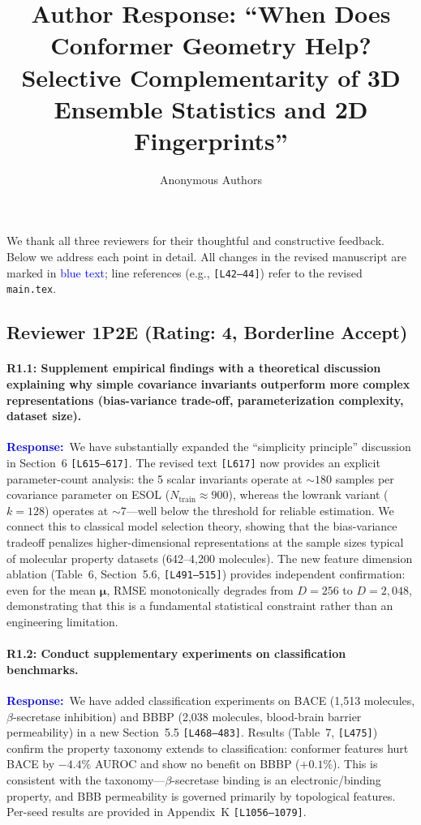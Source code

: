 \documentclass[11pt]{article}
\title{Author Response: ``When Does Conformer Geometry Help? Selective Complementarity of 3D Ensemble Statistics and 2D Fingerprints''}
\author{Anonymous Authors}
\date{}
\newcommand{\reviewer}[1]{\subsection*{#1}}
\newcommand{\point}[1]{\paragraph{#1}}
\newcommand{\response}{\textcolor{blue}{\textbf{Response:}}~}
\newcommand{\lines}[1]{\texttt{[L#1]}}
\begin{document}
\maketitle

We thank all three reviewers for their thoughtful and constructive feedback. Below we address each point in detail. All changes in the revised manuscript are marked in \textcolor{blue}{blue text}; line references (e.g., \lines{42--44}) refer to the revised \texttt{main.tex}.

\reviewer{Reviewer 1P2E (Rating: 4, Borderline Accept)}

\point{R1.1: Supplement empirical findings with a theoretical discussion explaining why simple covariance invariants outperform more complex representations (bias-variance trade-off, parameterization complexity, dataset size).}

\response We have substantially expanded the ``simplicity principle'' discussion in Section~6 \lines{615--617}. The revised text \lines{617} now provides an explicit parameter-count analysis: the 5 scalar invariants operate at ${\sim}180$ samples per covariance parameter on ESOL ($N_\text{train} \approx 900$), whereas the lowrank variant ($k{=}128$) operates at ${\sim}7$---well below the threshold for reliable estimation. We connect this to classical model selection theory, showing that the bias-variance tradeoff penalizes higher-dimensional representations at the sample sizes typical of molecular property datasets (642--4,200 molecules). The new feature dimension ablation (Table~6, Section~5.6, \lines{491--515}) provides independent confirmation: even for the mean $\boldsymbol{\mu}$, RMSE monotonically degrades from $D{=}256$ to $D{=}2{,}048$, demonstrating that this is a fundamental statistical constraint rather than an engineering limitation.

\point{R1.2: Conduct supplementary experiments on classification benchmarks.}

\response We have added classification experiments on BACE (1,513 molecules, $\beta$-secretase inhibition) and BBBP (2,038 molecules, blood-brain barrier permeability) in a new Section~5.5 \lines{468--483}. Results (Table~7, \lines{475}) confirm the property taxonomy extends to classification: conformer features hurt BACE by $-4.4\%$ AUROC and show no benefit on BBBP ($+0.1\%$). This is consistent with the taxonomy---$\beta$-secretase binding is an electronic/binding property, and BBB permeability is governed primarily by topological features. Per-seed results are provided in Appendix~K \lines{1056--1079}.
\end{document}

